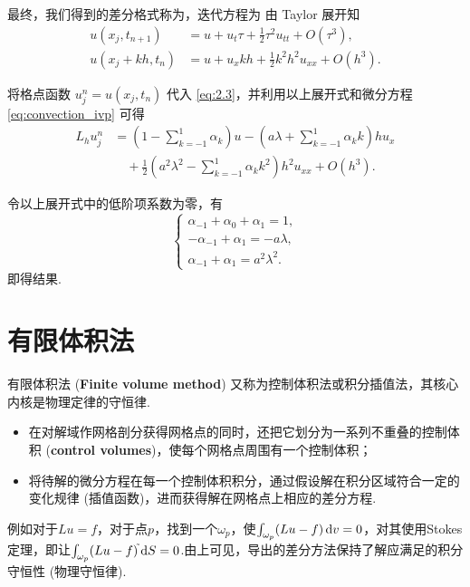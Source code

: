 \begin{instance}
    最终，我们得到的差分格式称为，迭代方程为
    \bluebf{\[ u_j^{n+1} = u_j^n - \frac{a\lambda}{2} (u_{j+1}^n - u_{j-1}^n) + \frac{a^2\lambda^2}{2} (u_{j+1}^n - 2u_j^n + u_{j-1}^n). \]}
    由 Taylor 展开知
\begin{align*}
    u(x_j, t_{n+1}) &= u + u_t \tau + \frac{1}{2} \tau^2 u_{tt} + O\left(\tau^3\right), \\
    u(x_j + kh, t_n) &= u + u_x kh + \frac{1}{2} k^2 h^2 u_{xx} + O\left(h^3\right).
\end{align*}

将格点函数 $u_j^n = u(x_j, t_n)$ 代入 \eqref{eq:2.3}，并利用以上展开式和微分方程 \eqref{eq:convection_ivp} 可得
\begin{align*}
    L_h u_j^n &= \left(1 - \sum_{k=-1}^1 \alpha_k\right)u - \left(a\lambda + \sum_{k=-1}^1 \alpha_k k\right)hu_x \\
    &\quad + \frac{1}{2}\left(a^2\lambda^2 - \sum_{k=-1}^1 \alpha_k k^2\right)h^2 u_{xx} + O(h^3).
\end{align*}

令以上展开式中的低阶项系数为零，有
\begin{equation*}
    \begin{cases}
        \alpha_{-1} + \alpha_0 + \alpha_1 = 1, \\
        -\alpha_{-1} + \alpha_1 = -a\lambda, \\
        \alpha_{-1} + \alpha_1 = a^2\lambda^2.
    \end{cases}
\end{equation*}
即得结果.
\end{instance}



\section{有限体积法}

有限体积法 (\textbf{Finite volume method}) 又称为控制体积法或积分插值法，其核心内核是物理定律的守恒律.\par

\begin{note}[基本思路]
\begin{itemize}
    \item 在对解域作网格剖分获得网格点的同时，还把它划分为一系列不重叠的控制体积 (\textbf{control volumes})，使每个网格点周围有一个控制体积；
    \item 将待解的微分方程在每一个控制体积积分，通过假设解在积分区域符合一定的变化规律 (插值函数)，进而获得解在网格点上相应的差分方程.
\end{itemize}
\end{note}
例如对于$Lu=f$，对于点$p$，找到一个$\omega_p$，使$\int_{\omega_p}(Lu-f)\mathop{}\!\mathrm{d} v=0$，对其使用Stokes定理，即让$\int_{\omega_p}(Lu-f)^{\tilde{}} \mathop{}\!\mathrm{d} S=0$.由上可见，导出的差分方法保持了解应满足的积分守恒性 (物理守恒律).

